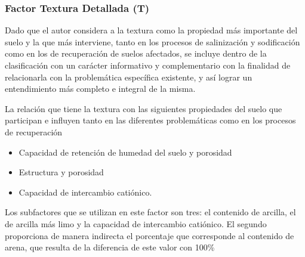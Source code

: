 \subsubsection{Factor Textura Detallada (T)}
Dado que el autor considera a la textura como la propiedad más importante del suelo y la que más interviene, tanto en los procesos de salinización y sodificación como en los de recuperación de suelos afectados, se incluye dentro de la clasificación con un carácter informativo y complementario con la finalidad de relacionarla con la problemática específica existente, y así lograr un entendimiento más completo e integral de la misma.

La relación que tiene la textura con las siguientes propiedades del suelo que participan e influyen tanto en las diferentes problemáticas como en los procesos de recuperación
\begin{itemize}
    \item Capacidad de retención de humedad del suelo y porosidad
    \item Estructura y porosidad
    \item Capacidad de intercambio catiónico.
\end{itemize}
Los subfactores que se utilizan en este factor son tres: el contenido de arcilla, el de arcilla más limo y la capacidad de intercambio catiónico. El segundo proporciona de manera indirecta el porcentaje que corresponde al contenido de arena, que resulta de la diferencia de este valor con 100\%

